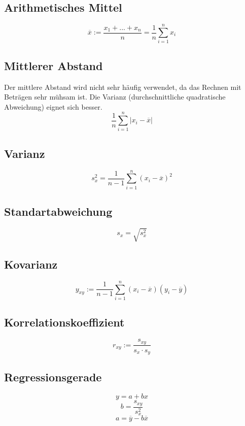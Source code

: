 \documentclass[12pt]{article}
\begin{document}
\subsection{Arithmetisches Mittel}
\begin{equation*}
	\overline{x} := \frac{x_1 + ... + x_n}{n} = \frac{1}{n}\sum_{i=1}^{n}{x_i}
\end{equation*}
\subsection{Mittlerer Abstand}
Der mittlere Abstand wird nicht sehr häufig verwendet, da das Rechnen mit Beträgen sehr mühsam ist. Die Varianz (durchschnittliche quadratische Abweichung) eignet sich besser.
\begin{equation*}
	\frac{1}{n}\sum_{i=1}^{n}{|x_i-\overline{x}|}
\end{equation*}
\subsection{Varianz}
\begin{equation*}
	s_x^2= \frac{1}{n-1}\sum_{i=1}^n{(x_i-\overline{x})^2}
\end{equation*}
\subsection{Standartabweichung}
\begin{equation*}
	s_x = \sqrt{s_x^2}
\end{equation*}
\subsection{Kovarianz}
\begin{equation*}
	y_{xy}:=\frac{1}{n-1}\sum_{i=1}^n(x_i-\overline{x})(y_i-\overline{y})
\end{equation*}
\subsection{Korrelationskoeffizient}
\begin{equation*}
	r_{xy}:=\frac{s_{xy}}{s_x\cdot s_y}
\end{equation*}
\subsection{Regressionsgerade}
\begin{equation*}
	y = a + bx
\end{equation*}
\begin{equation*}
	b = \frac{s_{xy}}{s_x^2}
\end{equation*}
\begin{equation*}
	a = \overline{y} - b\overline{x}
\end{equation*}
\end{document}
